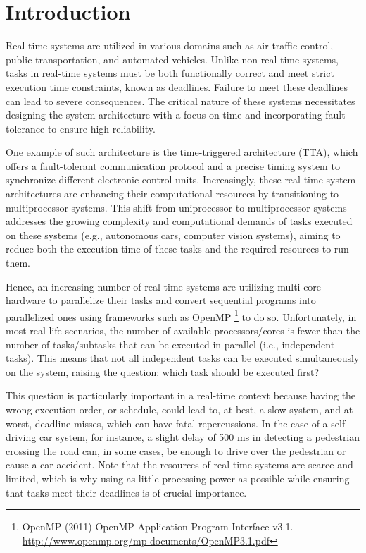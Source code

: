 \section{Introduction}
\label{sec:intro}

Real-time systems are utilized in various domains such as air traffic 
control, public transportation, and automated vehicles. Unlike non-real-time systems, 
tasks in real-time systems must be both functionally correct and meet strict 
 execution time constraints, known as deadlines. Failure 
to meet these deadlines can lead to severe consequences. The critical 
nature of these systems necessitates designing the system 
architecture with a focus on time and incorporating fault tolerance 
to ensure high reliability.

One example of such architecture is the time-triggered 
architecture (TTA)\cite{kopetz2003tta}\cite{kopetz1998timetriggered}, which offers a fault-tolerant 
communication protocol and a precise timing system to synchronize different electronic control units. 
Increasingly, these real-time system architectures are enhancing their 
computational resources by transitioning to multiprocessor systems. 
This shift from uniprocessor to multiprocessor systems addresses 
the growing complexity and computational demands of tasks executed 
on these systems (e.g., autonomous cars, computer vision systems), aiming to reduce both the execution time of these 
tasks and the required resources to run them\cite{maiza2019survey}.

Hence, an increasing number of real-time systems are 
utilizing multi-core hardware to parallelize their tasks 
and convert sequential programs into parallelized ones using 
frameworks such as OpenMP
\footnote{OpenMP (2011) OpenMP Application Program Interface v3.1. 
\url{http://www.openmp.org/mp-documents/OpenMP3.1.pdf}} to do so. 
Unfortunately, in most real-life scenarios, the number of available 
processors/cores is fewer than the number of tasks/subtasks that 
can be executed in parallel (i.e., independent tasks). This means 
that not all independent tasks can be executed simultaneously on 
the system, raising the question: which task should be executed first?

This question is particularly important in a real-time context
because having the wrong execution order, or schedule, could lead 
to, at best, a slow system, and at worst, deadline misses, which 
can have fatal repercussions. In the case of a self-driving car 
system, for instance, a slight delay of 500 ms in detecting a pedestrian 
crossing the road can, in some cases, be enough to drive over 
the pedestrian or cause a car accident. Note that the resources of 
real-time systems are scarce and limited, which is why using as 
little processing power as possible while ensuring that tasks meet 
their deadlines is of crucial importance.

